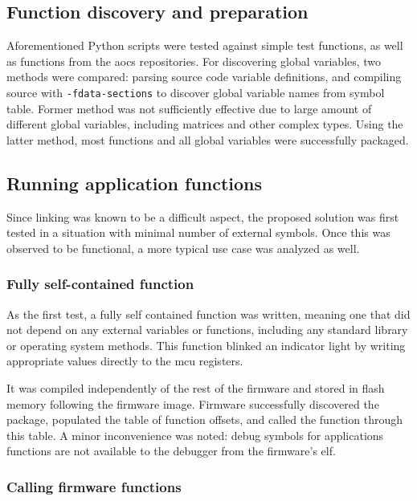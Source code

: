 \subsection{Function discovery and preparation}

Aforementioned Python scripts were tested against simple test functions, as well as functions from the \gls{aocs} repositories. For discovering global variables, two methods were compared: parsing source code variable definitions, and compiling source with \texttt{-fdata-sections} to discover global variable names from symbol table. Former method was not sufficiently effective due to large amount of different global variables, including matrices and other complex types. Using the latter method, most functions and all global variables were successfully packaged.

\subsection{Running application functions}

Since linking was known to be a difficult aspect, the proposed solution was first tested in a situation with minimal number of external symbols. Once this was observed to be functional, a more typical use case was analyzed as well.

\subsubsection{Fully self-contained function}

As the first test, a fully self contained function was written, meaning one that did not depend on any external variables or functions, including any standard library or operating system methods. This function blinked an indicator light by writing appropriate values directly to the \gls{mcu} registers.

It was compiled independently of the rest of the firmware and stored in flash memory following the firmware image. Firmware successfully discovered the package, populated the table of function offsets, and called the function through this table. A minor inconvenience was noted: debug symbols for applications functions are not available to the debugger from the firmware's \gls{elf}.

\subsubsection{Calling firmware functions}

